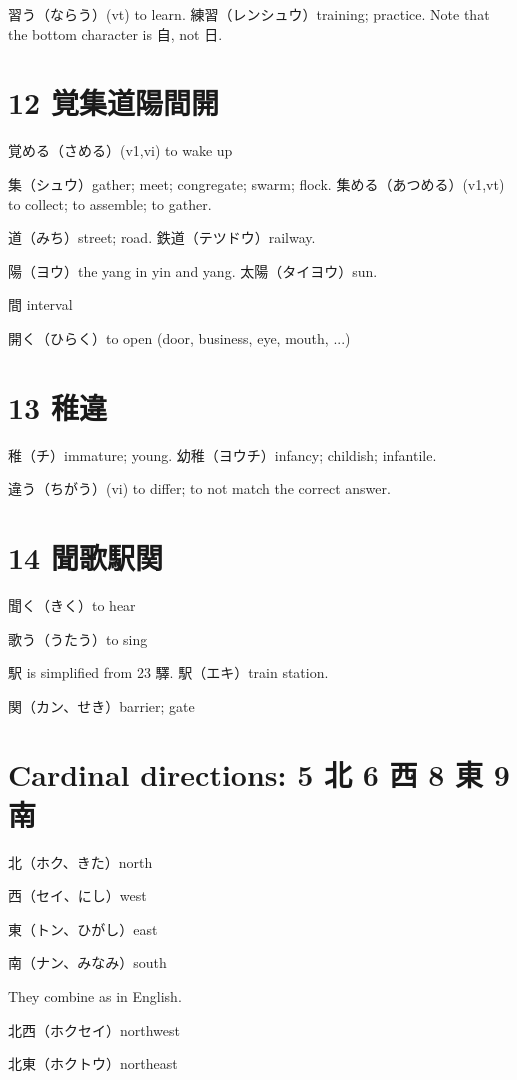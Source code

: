 習う（ならう）(vt) to learn.
練習（レンシュウ）training; practice.
Note that the bottom character is 自, not 日.

\section{12 覚集道陽間開}

覚める（さめる）(v1,vi) to wake up

集（シュウ）gather; meet; congregate; swarm; flock.
集める（あつめる）(v1,vt) to collect; to assemble; to gather.

道（みち）street; road.
鉄道（テツドウ）railway.

陽（ヨウ）the yang in yin and yang.
太陽（タイヨウ）sun.

間 interval

開く（ひらく）to open (door, business, eye, mouth, ...)

\section{13 稚違}

稚（チ）immature; young.
幼稚（ヨウチ）infancy; childish; infantile.

違う（ちがう）(vi) to differ; to not match the correct answer.

\section{14 聞歌駅関}

聞く（きく）to hear

歌う（うたう）to sing

駅 is simplified from 23 驛.
駅（エキ）train station.

関（カン、せき）barrier; gate

\section{Cardinal directions: 5 北 6 西 8 東 9 南}

北（ホク、きた）north

西（セイ、にし）west

東（トン、ひがし）east

南（ナン、みなみ）south

They combine as in English.

北西（ホクセイ）northwest

北東（ホクトウ）northeast

